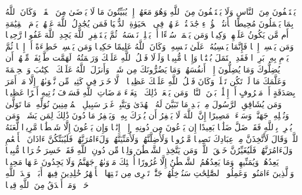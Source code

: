 \startbuffer[\q:4:108]
یَسۡتَخۡفُونَ مِنَ ٱلنَّاسِ وَلَا یَسۡتَخۡفُونَ مِنَ ٱللَّهِ وَهُوَ مَعَهُمۡ إِذۡ یُبَیِّتُونَ مَا لَا یَرۡضَىٰ مِنَ ٱلۡقَوۡلِۚ وَكَانَ ٱللَّهُ بِمَا یَعۡمَلُونَ مُحِیطًا%
\stopbuffer
\startbuffer[\q:4:109]
هَٰۤأَنتُمۡ هَٰۤؤُلَاۤءِ جَٰدَلۡتُمۡ عَنۡهُمۡ فِی ٱلۡحَیَوٰةِ ٱلدُّنۡیَا فَمَن یُجَٰدِلُ ٱللَّهَ عَنۡهُمۡ یَوۡمَ ٱلۡقِیَٰمَةِ أَم مَّن یَكُونُ عَلَیۡهِمۡ وَكِیلࣰا%
\stopbuffer
\startbuffer[\q:4:110]
وَمَن یَعۡمَلۡ سُوۤءًا أَوۡ یَظۡلِمۡ نَفۡسَهُۥ ثُمَّ یَسۡتَغۡفِرِ ٱللَّهَ یَجِدِ ٱللَّهَ غَفُورࣰا رَّحِیمࣰا%
\stopbuffer
\startbuffer[\q:4:111]
وَمَن یَكۡسِبۡ إِثۡمࣰا فَإِنَّمَا یَكۡسِبُهُۥ عَلَىٰ نَفۡسِهِۦۚ وَكَانَ ٱللَّهُ عَلِیمًا حَكِیمࣰا%
\stopbuffer
\startbuffer[\q:4:112]
وَمَن یَكۡسِبۡ خَطِیۤءَةً أَوۡ إِثۡمࣰا ثُمَّ یَرۡمِ بِهِۦ بَرِیۤءࣰا فَقَدِ ٱحۡتَمَلَ بُهۡتَٰنࣰا وَإِثۡمࣰا مُّبِینࣰا%
\stopbuffer
\startbuffer[\q:4:113]
وَلَوۡلَا فَضۡلُ ٱللَّهِ عَلَیۡكَ وَرَحۡمَتُهُۥ لَهَمَّت طَّاۤئِفَةࣱ مِّنۡهُمۡ أَن یُضِلُّوكَ وَمَا یُضِلُّونَ إِلَّاۤ أَنفُسَهُمۡۖ وَمَا یَضُرُّونَكَ مِن شَیۡءࣲۚ وَأَنزَلَ ٱللَّهُ عَلَیۡكَ ٱلۡكِتَٰبَ وَٱلۡحِكۡمَةَ وَعَلَّمَكَ مَا لَمۡ تَكُن تَعۡلَمُۚ وَكَانَ فَضۡلُ ٱللَّهِ عَلَیۡكَ عَظِیمࣰا%
\stopbuffer
\startbuffer[\q:4:114]
۞ لَّا خَیۡرَ فِی كَثِیرࣲ مِّن نَّجۡوَىٰهُمۡ إِلَّا مَنۡ أَمَرَ بِصَدَقَةٍ أَوۡ مَعۡرُوفٍ أَوۡ إِصۡلَٰحِۭ بَیۡنَ ٱلنَّاسِۚ وَمَن یَفۡعَلۡ ذَٰلِكَ ٱبۡتِغَاۤءَ مَرۡضَاتِ ٱللَّهِ فَسَوۡفَ نُؤۡتِیهِ أَجۡرًا عَظِیمࣰا%
\stopbuffer
\startbuffer[\q:4:115]
وَمَن یُشَاقِقِ ٱلرَّسُولَ مِنۢ بَعۡدِ مَا تَبَیَّنَ لَهُ ٱلۡهُدَىٰ وَیَتَّبِعۡ غَیۡرَ سَبِیلِ ٱلۡمُؤۡمِنِینَ نُوَلِّهِۦ مَا تَوَلَّىٰ وَنُصۡلِهِۦ جَهَنَّمَۖ وَسَاۤءَتۡ مَصِیرًا%
\stopbuffer
\startbuffer[\q:4:116]
إِنَّ ٱللَّهَ لَا یَغۡفِرُ أَن یُشۡرَكَ بِهِۦ وَیَغۡفِرُ مَا دُونَ ذَٰلِكَ لِمَن یَشَاۤءُۚ وَمَن یُشۡرِكۡ بِٱللَّهِ فَقَدۡ ضَلَّ ضَلَٰلَۢا بَعِیدًا%
\stopbuffer
\startbuffer[\q:4:117]
إِن یَدۡعُونَ مِن دُونِهِۦۤ إِلَّاۤ إِنَٰثࣰا وَإِن یَدۡعُونَ إِلَّا شَیۡطَٰنࣰا مَّرِیدࣰا%
\stopbuffer
\startbuffer[\q:4:118]
لَّعَنَهُ ٱللَّهُۘ وَقَالَ لَأَتَّخِذَنَّ مِنۡ عِبَادِكَ نَصِیبࣰا مَّفۡرُوضࣰا%
\stopbuffer
\startbuffer[\q:4:119]
وَلَأُضِلَّنَّهُمۡ وَلَأُمَنِّیَنَّهُمۡ وَلَءَامُرَنَّهُمۡ فَلَیُبَتِّكُنَّ ءَاذَانَ ٱلۡأَنۡعَٰمِ وَلَءَامُرَنَّهُمۡ فَلَیُغَیِّرُنَّ خَلۡقَ ٱللَّهِۚ وَمَن یَتَّخِذِ ٱلشَّیۡطَٰنَ وَلِیࣰّا مِّن دُونِ ٱللَّهِ فَقَدۡ خَسِرَ خُسۡرَانࣰا مُّبِینࣰا%
\stopbuffer
\startbuffer[\q:4:120]
یَعِدُهُمۡ وَیُمَنِّیهِمۡۖ وَمَا یَعِدُهُمُ ٱلشَّیۡطَٰنُ إِلَّا غُرُورًا%
\stopbuffer
\startbuffer[\q:4:121]
أُو۟لَٰۤئِكَ مَأۡوَىٰهُمۡ جَهَنَّمُ وَلَا یَجِدُونَ عَنۡهَا مَحِیصࣰا%
\stopbuffer
\startbuffer[\q:4:122]
وَٱلَّذِینَ ءَامَنُوا۟ وَعَمِلُوا۟ ٱلصَّٰلِحَٰتِ سَنُدۡخِلُهُمۡ جَنَّٰتࣲ تَجۡرِی مِن تَحۡتِهَا ٱلۡأَنۡهَٰرُ خَٰلِدِینَ فِیهَاۤ أَبَدࣰاۖ وَعۡدَ ٱللَّهِ حَقࣰّاۚ وَمَنۡ أَصۡدَقُ مِنَ ٱللَّهِ قِیلࣰا%
